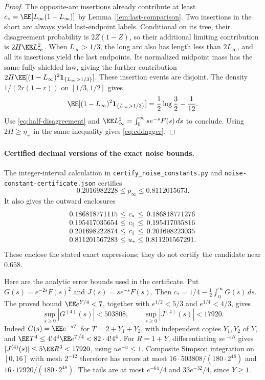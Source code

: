 \documentclass[11pt,letterpaper]{article}
\newcommand{\ind}{\mathbf 1}\newcommand{\Exp}{\operatorname{Exp}}
\begin{document}
\begin{proof}
The opposite-arc insertions already contribute at least
$c_*=\EE[L_\infty(1-L_\infty)]$ by Lemma~\ref{lem:last-comparison}.
Two insertions in the short arc always yield last-endpoint labels.
Conditional on its tree, their disagreement probability is $2Z(1-Z)$,
so their additional limiting contribution is $2H\EE L_\infty^2$.
When $L_\infty>1/3$, the long arc also has length less than
$2L_\infty$, and all its insertions yield the last endpoints.
Its normalized midpoint mass has the same fully shielded law, giving
the further contribution
$2H\EE[(1-L_\infty)^2\ind_{\{L_\infty>1/3\}}]$.
These insertion events are disjoint. The density
$1/(2r(1-r))$ on $[1/3,1/2]$ gives
\[
 \EE[(1-L_\infty)^2\ind_{\{L_\infty>1/3\}}]
   =\frac12\log\frac32-\frac1{12}.
\]
Use \eqref{eq:half-disagreement} and
$\EE L_\infty^2=\int_0^\infty se^{-s}F(s)\,ds$ to conclude.
Using $2H\ge\eta_+$ in the same inequality gives
\eqref{eq:cddagger}.
\end{proof}

\paragraph{Certified decimal versions of the exact noise bounds.}
The integer-interval calculation in
\texttt{certify\_noise\_constants.py} and
\texttt{noise-constant-certificate.json} certifies
\begin{equation}\label{eq:certified-noise-interval}
 0.2016982228\le p_\infty\le0.8112015673.
\end{equation}
It also gives the outward enclosures
\[
 \begin{array}{c@{\ \le\ }c@{\ \le\ }c}
 0.186818771115&c_*&0.186818771276\\
 0.195417035654&c_\dagger&0.195417035816\\
 0.201698222874&c_\ddagger&0.201698223035\\
 0.811201567283&u_*&0.811201567291.
 \end{array}
\]
These enclose the stated exact expressions; they do not certify the
candidate near $0.658$.

Here are the analytic error bounds used in the certificate.
Put $G(s)=e^{-2s}F(s)^2$ and $J(s)=se^{-s}F(s)$.
Then $c_*=1/4-\frac12\int_0^\infty G(s)\,ds$.
The proved bound $\EE e^{Y/4}<7$, together with
$e^{1/2}<5/3$ and $e^{1/4}<4/3$, gives
\[
 \sup_{s\ge0}|G^{(4)}(s)|<503808,
 \qquad \sup_{s\ge0}|J^{(4)}(s)|<17920.
\]
Indeed $G(s)=\EE e^{-sT}$ for $T=2+Y_1+Y_2$, with independent
copies $Y_1,Y_2$ of $Y$, and
$\EE T^4\le4!4^4\EE e^{T/4}<82\cdot4!4^4$.
For $R=1+Y$, differentiating $se^{-sR}$ gives
$|J^{(4)}(s)|\le5\EE R^3<17920$, using $u e^{-u}\le1$.
Composite Simpson integration on $[0,16]$ with mesh $2^{-12}$
therefore has errors at most $16\cdot503808/(180\cdot2^{48})$
and $16\cdot17920/(180\cdot2^{48})$.
The tails are at most $e^{-64}/4$ and $33e^{-32}/4$, since $Y\ge1$.
\end{document}
